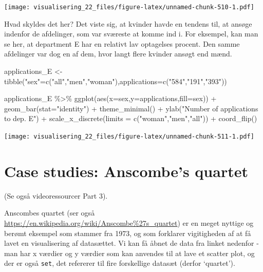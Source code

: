 \documentclass[
]{book}
\newenvironment{Shaded}{\begin{snugshade}}{\end{snugshade}}
\newcommand{\AttributeTok}[1]{\textcolor[rgb]{0.77,0.63,0.00}{#1}}
\newcommand{\FunctionTok}[1]{\textcolor[rgb]{0.00,0.00,0.00}{#1}}
\newcommand{\NormalTok}[1]{#1}
\newcommand{\OtherTok}[1]{\textcolor[rgb]{0.56,0.35,0.01}{#1}}
\newcommand{\SpecialCharTok}[1]{\textcolor[rgb]{0.00,0.00,0.00}{#1}}
\newcommand{\StringTok}[1]{\textcolor[rgb]{0.31,0.60,0.02}{#1}}
\begin{document}
\texttt{[image: visualisering\_22\_files/figure-latex/unnamed-chunk-510-1.pdf]}

Hvad skyldes det her? Det viste sig, at kvinder havde en tendens til, at ansøge indenfor de afdelinger, som var sværeste at komme ind i. For eksempel, kan man se her, at department E har en relativt lav optagelses procent. Den samme afdelinger var dog en af dem, hvor langt flere kvinder ansøgt end mænd.

\begin{Shaded}
\begin{Highlighting}[]
\NormalTok{applications\_E }\OtherTok{\textless{}{-}} \FunctionTok{tibble}\NormalTok{(}\StringTok{"sex"}\OtherTok{=}\FunctionTok{c}\NormalTok{(}\StringTok{"all"}\NormalTok{,}\StringTok{"men"}\NormalTok{,}\StringTok{"woman"}\NormalTok{),}\AttributeTok{applications=}\FunctionTok{c}\NormalTok{(}\StringTok{"584"}\NormalTok{,}\StringTok{"191"}\NormalTok{,}\StringTok{"393"}\NormalTok{))}


\NormalTok{applications\_E }\SpecialCharTok{\%\textgreater{}\%} \FunctionTok{ggplot}\NormalTok{(}\FunctionTok{aes}\NormalTok{(}\AttributeTok{x=}\NormalTok{sex,}\AttributeTok{y=}\NormalTok{applications,}\AttributeTok{fill=}\NormalTok{sex)) }\SpecialCharTok{+} 
  \FunctionTok{geom\_bar}\NormalTok{(}\AttributeTok{stat=}\StringTok{"identity"}\NormalTok{) }\SpecialCharTok{+} 
  \FunctionTok{theme\_minimal}\NormalTok{() }\SpecialCharTok{+} 
  \FunctionTok{ylab}\NormalTok{(}\StringTok{"Number of applications to dep. E"}\NormalTok{) }\SpecialCharTok{+}
  \FunctionTok{scale\_x\_discrete}\NormalTok{(}\AttributeTok{limits =} \FunctionTok{c}\NormalTok{(}\StringTok{"woman"}\NormalTok{,}\StringTok{"men"}\NormalTok{,}\StringTok{"all"}\NormalTok{)) }\SpecialCharTok{+}
  \FunctionTok{coord\_flip}\NormalTok{()}
\end{Highlighting}
\end{Shaded}

\texttt{[image: visualisering\_22\_files/figure-latex/unnamed-chunk-511-1.pdf]}

\hypertarget{case-studies-anscombes-quartet}{%
\section{Case studies: Anscombe's quartet}\label{case-studies-anscombes-quartet}}

(Se også videoressourcer Part 3).

Anscombes quartet (ser også \url{https://en.wikipedia.org/wiki/Anscombe\%27s_quartet}) er en meget nyttige og berømt eksempel som stammer fra 1973, og som forklarer vigitigheden af at få lavet en visualisering af datasættet. Vi kan få åbnet de data fra linket nedenfor - man har x værdier og y værdier som kan anvendes til at lave et scatter plot, og der er også \texttt{set}, det refererer til fire forskellige datasæt (derfor `quartet').
\end{document}
